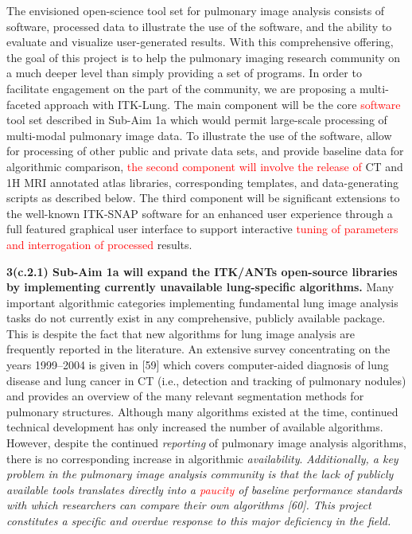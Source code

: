 \documentclass[11pt,]{article}
\begin{document}
The envisioned open-science tool set for pulmonary image analysis
consists of software, processed data to illustrate the use of the
software, and the ability to evaluate and visualize user-generated
results. With this comprehensive offering, the goal of this project is
to help the pulmonary imaging research community on a much deeper level
than simply providing a set of programs. In order to facilitate
engagement on the part of the community, we are proposing a
multi-faceted approach with ITK-Lung. The main component will be the
core \textcolor{red}{software} tool set described in Sub-Aim 1a which
would permit large-scale processing of multi-modal pulmonary image data.
To illustrate the use of the software, allow for processing of other
public and private data sets, and provide baseline data for algorithmic
comparison, \textcolor{red}{the second
component will involve the release of} CT and 1H MRI annotated atlas
libraries, corresponding templates, and data-generating scripts as
described below. The third component will be significant extensions to
the well-known ITK-SNAP software for an enhanced user experience through
a full featured graphical user interface to support interactive
\textcolor{red}{tuning of parameters and interrogation of processed}
results.

\textbf{3(c.2.1) Sub-Aim 1a will expand the ITK/ANTs open-source
libraries by implementing currently unavailable lung-specific
algorithms.} Many important algorithmic categories implementing
fundamental lung image analysis tasks do not currently exist in any
comprehensive, publicly available package. This is despite the fact that
new algorithms for lung image analysis are frequently reported in the
literature. An extensive survey concentrating on the years 1999--2004 is
given in {[}59{]} which covers computer-aided diagnosis of lung disease
and lung cancer in CT (i.e., detection and tracking of pulmonary
nodules) and provides an overview of the many relevant segmentation
methods for pulmonary structures. Although many algorithms existed at
the time, continued technical development has only increased the number
of available algorithms. However, despite the continued \emph{reporting}
of pulmonary image analysis algorithms, there is no corresponding
increase in algorithmic \emph{availability}. \emph{Additionally, a key
problem in the pulmonary image analysis community is that the lack of
publicly available tools translates directly into a
\textcolor{red}{paucity} of baseline performance standards with which
researchers can compare their own algorithms {[}60{]}. This project
constitutes a specific and overdue response to this major deficiency in
the field.}
\end{document}
